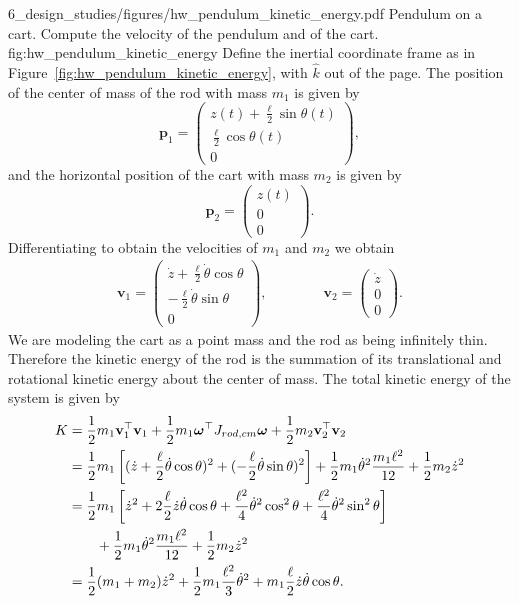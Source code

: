 	{6_design_studies/figures/hw_pendulum_kinetic_energy.pdf} 
	{Pendulum on a cart.  Compute the velocity of the pendulum and of the cart.}
	{fig:hw_pendulum_kinetic_energy}
Define the inertial coordinate frame as in Figure~\ref{fig:hw_pendulum_kinetic_energy}, with $\hat{k}$ out of the page.  
The position of the center of mass of the rod with mass $m_1$ is given by
\[
\mathbf{p}_1 = \begin{pmatrix}  z(t) + \frac{\ell}{2} \sin\theta(t) \\ \frac{\ell}{2} \cos\theta(t) \\ 0 \end{pmatrix},
\]
and the horizontal position of the cart with mass $m_2$ is given by 
\[
\mathbf{p}_2 = \begin{pmatrix} z(t) \\ 0 \\ 0 \end{pmatrix}.
\]
Differentiating to obtain the velocities of $m_1$ and $m_2$ we obtain
\begin{align*}
\mathbf{v}_1 = \begin{pmatrix}  \dot{z} + \frac{\ell}{2}\dot{\theta}\cos\theta \\ -\frac{\ell}{2}\dot{\theta}\sin\theta \\ 0 \end{pmatrix}, \qquad\qquad
\mathbf{v}_2 = \begin{pmatrix}  \dot{z} \\ 0 \\ 0 \end{pmatrix}.
\end{align*}
We are modeling the cart as a point mass and the rod as being infinitely thin.  Therefore the kinetic energy of the rod is the summation of its translational and rotational kinetic energy about the center of mass.  The total kinetic energy of the system is given by
\begin{align}
K &= \frac{1}{2} m_1 \mathbf{v}_1^\top \mathbf{v}_1 + \frac{1}{2} m_1\boldsymbol{\omega}^\top J_{rod,cm} \boldsymbol{\omega} + \frac{1}{2}m_2\mathbf{v}_2^\top \mathbf{v}_2 \notag\\
  &= \frac{1}{2} m_1 \left[ (\dot{z} + \frac{\ell}{2}\dot{\theta}\cos\theta)^2 + (-\frac{\ell}{2}\dot{\theta}\sin\theta)^2 \right] +  \frac{1}{2}m_1\dot{\theta}^2 \frac{m_1 \ell^2}{12} +  \frac{1}{2}m_2\dot{z}^2 \notag\\
  &= \frac{1}{2} m_1 \left[ \dot{z}^2 + 2\frac{\ell}{2}\dot{z}\dot{\theta}\cos\theta + \frac{\ell^2}{4}\dot{\theta}^2\cos^2\theta + \frac{\ell^2}{4}\dot{\theta}^2\sin^2\theta \right] \notag
  	\\&\qquad
  	 +  \frac{1}{2}m_1\dot{\theta}^2 \frac{m_1 \ell^2}{12} + \frac{1}{2}m_2\dot{z}^2 \notag\\
  &= \frac{1}{2}(m_1+m_2)\dot{z}^2 + \frac{1}{2}m_1\frac{\ell^2}{3}\dot{\theta}^2 + m_1\frac{\ell}{2}\dot{z}\dot{\theta}\cos\theta.
  \label{eq:pendulum_kinetic_energy}
\end{align}






